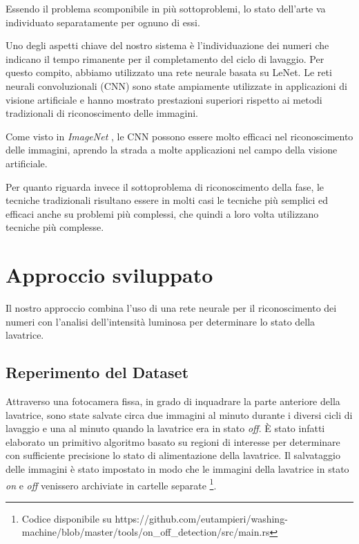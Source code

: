 \documentclass{article}
\begin{document}
\par Essendo il problema scomponibile in più sottoproblemi, lo stato
dell'arte va individuato separatamente per ognuno di essi.

\par Uno degli aspetti chiave del nostro sistema è l'individuazione dei
numeri che indicano il tempo rimanente per il completamento del ciclo di
lavaggio. Per questo compito, abbiamo utilizzato una rete neurale basata
su LeNet\citep{lecun2015lenet}. Le reti neurali convoluzionali (CNN) sono state ampiamente
utilizzate in applicazioni di visione artificiale e hanno mostrato
prestazioni superiori rispetto ai metodi tradizionali di riconoscimento
delle immagini.

\par Come visto in \textit{ImageNet} \citep{krizhevsky2012imagenet},
le CNN possono essere molto efficaci nel riconoscimento
delle immagini, aprendo la strada a molte applicazioni nel campo della
visione artificiale.

\par Per quanto riguarda invece il sottoproblema di riconoscimento della
fase, le tecniche tradizionali risultano essere in molti casi le
tecniche più semplici ed efficaci anche su problemi più complessi,
che quindi a loro volta utilizzano tecniche più complesse\citep{o2020deep}.

\section{Approccio sviluppato}\label{approccio-sviluppato}

\par Il nostro approccio combina l'uso di una rete neurale per il
riconoscimento dei numeri con l'analisi dell'intensità luminosa per
determinare lo stato della lavatrice.

\subsection{Reperimento del Dataset}\label{reperimento-del-dataset}

\par Attraverso una fotocamera fissa, in grado di inquadrare la parte
anteriore della lavatrice, sono state salvate circa due immagini al
minuto durante i diversi cicli di lavaggio e una al minuto quando la
lavatrice era in stato \textit{off}. È stato infatti elaborato un primitivo
algoritmo basato su regioni di interesse per determinare con sufficiente
precisione lo stato di alimentazione della lavatrice. Il salvataggio
delle immagini è stato impostato in modo che le immagini della lavatrice
in stato \textit{on} e \textit{off} venissero archiviate in cartelle separate
\footnote{Codice disponibile su https://github.com/eutampieri/washing-machine/blob/master/tools/on\_off\_detection/src/main.rs}.
\end{document}
